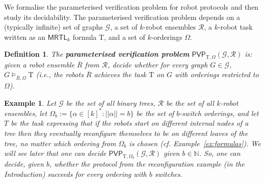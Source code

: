 \documentclass{llncs}
\newcommand{\head}[1]{\vspace{2mm} \noindent  {\bf #1}}
\newtheorem{definition}{Definition}
\newtheorem{example}{Example}
\def\MRTL{\textsf{MRTL}}
\def\gclass{\mathcal{G}}
\def\rclass{\mathcal{R}}
\def\T{\mathrm{T}}
\def\nat{\mathbb{N}}
\def\PVP{\mathsf{PVP}}
\newcommand{\tup}[1]{\overline{#1}}
\begin{document}
We formalise the parameterised verification problem for robot protocols and then study its decidability.
%
The parameterised verification problem depends on a (typically infinite) set of graphs $\gclass$, a set of $k$-robot ensembles $\rclass$, a $k$-robot task written as an $\MRTL_k$ formula $\T$, and a set of $k$-orderings $\Omega$.

\begin{definition}
The \textbf{parameterised verification problem} $\PVP_{\T,\Omega}(\gclass,\rclass)$ is: given a robot ensemble $\tup{R}$ from $\rclass$, decide whether for every graph $G \in \gclass$, $G \models_{\tup{R},\Omega} \T$ (i.e., the robots $\tup{R}$ achieves the task $\T$ on $G$ with orderings restricted to $\Omega$).
\end{definition}

\begin{example}
Let $\gclass$ be the set of all binary trees, $\rclass$ be the set of all $k$-robot ensembles,  let $\Omega_b := \{\alpha \in [k]^* : ||\alpha|| = b\}$ be the set of {\em $b$-switch orderings}, and let $T$ be the task expressing that if the robots start on different internal nodes of a tree then they eventually reconfigure themselves to be on different leaves of the tree, no matter which ordering from $\Omega_b$ is chosen (cf. Example~\ref{ex:formulas}). We will see later that one can decide $\PVP_{\T,\Omega_b}(\gclass,\rclass)$ given $b \in \nat$. So, one can decide, given $b$, whether the protocol from the reconfiguration example (in the Introduction) succeeds for every ordering with $b$ switches.
\end{example}
\end{document}
